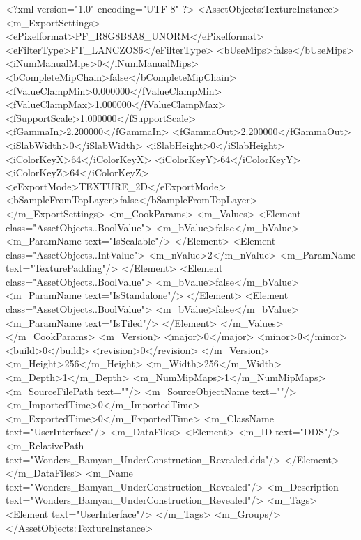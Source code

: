 <?xml version="1.0" encoding="UTF-8" ?>
<AssetObjects:TextureInstance>
<m_ExportSettings>
<ePixelformat>PF_R8G8B8A8_UNORM</ePixelformat>
<eFilterType>FT_LANCZOS6</eFilterType>
<bUseMips>false</bUseMips>
<iNumManualMips>0</iNumManualMips>
<bCompleteMipChain>false</bCompleteMipChain>
<fValueClampMin>0.000000</fValueClampMin>
<fValueClampMax>1.000000</fValueClampMax>
<fSupportScale>1.000000</fSupportScale>
<fGammaIn>2.200000</fGammaIn>
<fGammaOut>2.200000</fGammaOut>
<iSlabWidth>0</iSlabWidth>
<iSlabHeight>0</iSlabHeight>
<iColorKeyX>64</iColorKeyX>
<iColorKeyY>64</iColorKeyY>
<iColorKeyZ>64</iColorKeyZ>
<eExportMode>TEXTURE_2D</eExportMode>
<bSampleFromTopLayer>false</bSampleFromTopLayer>
</m_ExportSettings>
<m_CookParams>
<m_Values>
<Element class="AssetObjects..BoolValue">
<m_bValue>false</m_bValue>
<m_ParamName text="IsScalable"/>
</Element>
<Element class="AssetObjects..IntValue">
<m_nValue>2</m_nValue>
<m_ParamName text="TexturePadding"/>
</Element>
<Element class="AssetObjects..BoolValue">
<m_bValue>false</m_bValue>
<m_ParamName text="IsStandalone"/>
</Element>
<Element class="AssetObjects..BoolValue">
<m_bValue>false</m_bValue>
<m_ParamName text="IsTiled"/>
</Element>
</m_Values>
</m_CookParams>
<m_Version>
<major>0</major>
<minor>0</minor>
<build>0</build>
<revision>0</revision>
</m_Version>
<m_Height>256</m_Height>
<m_Width>256</m_Width>
<m_Depth>1</m_Depth>
<m_NumMipMaps>1</m_NumMipMaps>
<m_SourceFilePath text=""/>
<m_SourceObjectName text=""/>
<m_ImportedTime>0</m_ImportedTime>
<m_ExportedTime>0</m_ExportedTime>
<m_ClassName text="UserInterface"/>
<m_DataFiles>
<Element>
<m_ID text="DDS"/>
<m_RelativePath text="Wonders_Bamyan_UnderConstruction_Revealed.dds"/>
</Element>
</m_DataFiles>
<m_Name text="Wonders_Bamyan_UnderConstruction_Revealed"/>
<m_Description text="Wonders_Bamyan_UnderConstruction_Revealed"/>
<m_Tags>
<Element text="UserInterface"/>
</m_Tags>
<m_Groups/>
</AssetObjects:TextureInstance>
